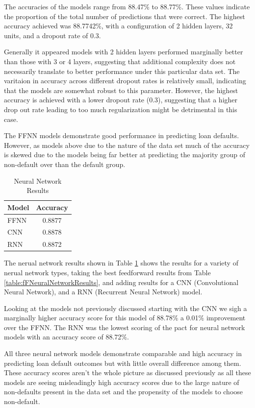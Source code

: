 \documentclass[12pt]{article}
\begin{document}
The accuracies of the models range from 88.47\% to 88.77\%. These values indicate the proportion of the total number of predictions that were correct. The highest accuracy achieved was 88.7742\%, with a configuration of 2 hidden layers, 32 units, and a dropout rate of 0.3. 

Generally it appeared models with 2 hidden layers performed marginally better than those with 3 or 4 layers, suggesting that additional complexity does not necessarily translate to better performance under this particular data set. The varitaion in accuracy across different dropout rates is relatively small, indicating that the models are somewhat robust to this parameter. However, the highest accuracy is achieved with a lower dropout rate (0.3), suggesting that a higher drop out rate leading to too much regularization might be detrimental in this case.

The FFNN models demonstrate good performance in predicting loan defaults. However, as models above due to the nature of the data set much of the accuracy is skewed due to the models being far better at predicting the majority group of non-default over than the default group.

\begin{table}[htbp]
    \centering
    \caption{Neural Network Results}
    \begin{tabular}{lc}
        \toprule
        Model & Accuracy \\
        \midrule
        FFNN & 0.8877 \\
        CNN & 0.8878 \\
        RNN & 0.8872 \\
        \bottomrule
    \end{tabular}
    \label{table:neuralNetworkResults}
\end{table}

The nerual network results shown in Table \ref{table:neuralNetworkResults} shows the results for a variety of nerual network types, taking the best feedforward results from Table \ref{table:fFNeuralNetworkResults}, and adding results for a CNN (Convolutional Neural Network), and a RNN (Recurrent Neural Network) model.

Looking at the models not previously discussed starting with the CNN we sigh a marginally higher accuracy score for this model of 88.78\% a 0.01\% improvement over the FFNN. The RNN was the lowest scoring of the pact for neural network models with an accuracy score of 88.72\%.

All three neural network models demonstrate comparable and high accuracy in predicting loan default outcomes but with little overall difference among them. These accuracy scores aren't the whole picture as discussed previously as all these models are seeing misleadingly high accuracy scores due to the large nature of non-defaults present in the data set and the propensity of the models to choose non-default.
\end{document}
